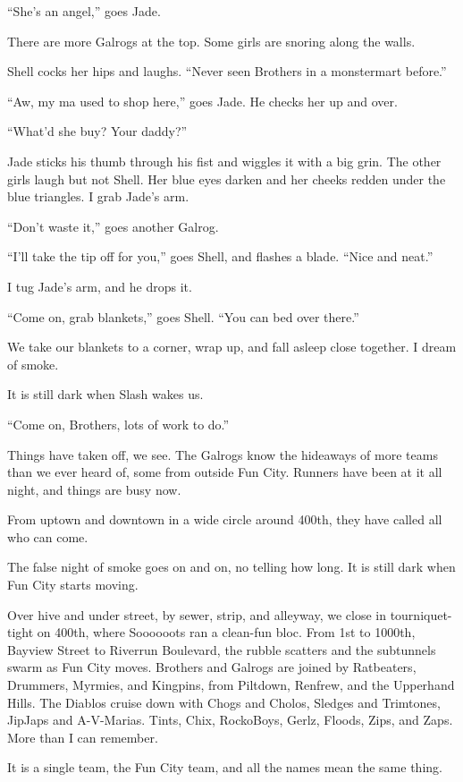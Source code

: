 ``She's an angel,'' goes Jade.

There are more Galrogs at the top. Some girls are snoring along the walls.

Shell cocks her hips and laughs. ``Never seen Brothers in a monstermart before.''

``Aw, my ma used to shop here,'' goes Jade. He checks her up and over.

``What'd she buy? Your daddy?''

Jade sticks his thumb through his fist and wiggles it with a big grin. The other girls laugh but not Shell. Her blue eyes darken and her cheeks redden under the blue triangles. I grab Jade's arm.

``Don't waste it,'' goes another Galrog.

``I'll take the tip off for you,'' goes Shell, and flashes a blade. ``Nice and neat.''

I tug Jade's arm, and he drops it.

``Come on, grab blankets,'' goes Shell. ``You can bed over there.''

We take our blankets to a corner, wrap up, and fall asleep close together. I dream of smoke.

It is still dark when Slash wakes us.

``Come on, Brothers, lots of work to do.''

Things have taken off, we see. The Galrogs know the hideaways of more teams than we ever heard of, some from outside Fun City. Runners have been at it all night, and things are busy now.

From uptown and downtown in a wide circle around 400th, they have called all who can come.

The false night of smoke goes on and on, no telling how long. It is still dark when Fun City starts moving.

Over hive and under street, by sewer, strip, and alleyway, we close in tourniquet-tight on 400th, where Soooooots ran a clean-fun bloc. From 1st to 1000th, Bayview Street to Riverrun Boulevard, the rubble scatters and the subtunnels swarm as Fun City moves. Brothers and Galrogs are joined by Ratbeaters, Drummers, Myrmies, and Kingpins, from Piltdown, Renfrew, and the Upperhand Hills. The Diablos cruise down with Chogs and Cholos, Sledges and Trimtones, JipJaps and A-V-Marias. Tints, Chix, RockoBoys, Gerlz, Floods, Zips, and Zaps. More than I can remember.

It is a single team, the Fun City team, and all the names mean the same thing.

